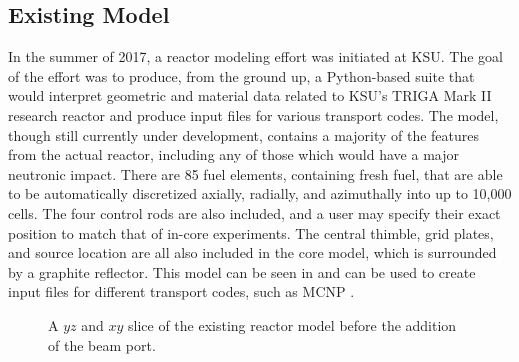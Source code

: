 \subsection{Existing Model}

In the summer of 2017, a reactor modeling effort was initiated at KSU.
The goal of the effort was to produce, from the ground up, a Python-based suite that would interpret geometric and material data related to KSU's TRIGA Mark II research reactor and produce input files for various transport codes.
The model, though still currently under development, contains a majority of the features from the actual reactor, including any of those which would have a major neutronic impact.
There are 85 fuel elements, containing fresh fuel, that are able to be automatically discretized axially, radially, and azimuthally into up to 10,000 cells.
The four control rods are also included, and a user may specify their exact position to match that of in-core experiments.
The central thimble, grid plates, and source location are all also included in the core model, which is surrounded by a graphite reflector.
This model can be seen in  and can be used to create input files for different transport codes, such as MCNP \cite{goorley2012initial}.

\begin{figure}
\centering
{} 
\caption[Old Reactor Model]{A $yz$ and $xy$ slice of the existing reactor model before the addition of the beam port.}
\label{fig:existing}
\end{figure}


